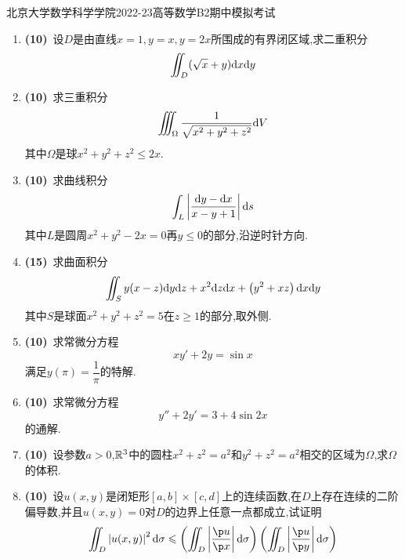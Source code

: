 \documentclass{ctexart}
\begin{document}
\pagestyle{empty}
\begin{center}\Large
    北京大学数学科学学院2022-23高等数学B2期中模拟考试
\end{center}
\begin{enumerate}[leftmargin=*,label=\textbf{\arabic*.}]
    \item \textbf{(10)}\ 设$D$是由直线$x=1,y=x,y=2x$所围成的有界闭区域,求二重积分
        \[\iint_D(\sqrt x+y)\mathrm{d} x\mathrm{d} y\]
    \item \textbf{(10)}\ 求三重积分
        \[\iiint_\Omega\dfrac{1}{\sqrt{x^2+y^2+z^2}}\mathrm{d} V\]
        其中$\Omega$是球$x^2+y^2+z^2\leqslant 2x$.
    \item \textbf{(10)}\ 求曲线积分
        \[\int_L\left|\dfrac{\mathrm{d} y-\mathrm{d} x}{x-y+1}\right|\mathrm{d} s\]
        其中$L$是圆周$x^2+y^2-2x=0$再$y\leqslant 0$的部分,沿逆时针方向.
    \item \textbf{(15)}\ 求曲面积分
        \[\iint_Sy(x-z)\mathrm{d} y\mathrm{d} z+x^2\mathrm{d} z\mathrm{d} x+\left(y^2+xz\right)\mathrm{d} x\mathrm{d} y\]
        其中$S$是球面$x^2+y^2+z^2=5$在$z\geqslant 1$的部分,取外侧.
    \item \textbf{(10)}\ 求常微分方程
        \[xy'+2y=\sin x\]
        满足$y(\pi)=\dfrac1\pi$的特解.
    \item \textbf{(10)}\ 求常微分方程
        \[y''+2y'=3+4\sin 2x\]
        的通解.
    \item \textbf{(10)}\ 设参数$a>0$,$\mathbb{R}^3$中的圆柱$x^2+z^2=a^2$和$y^2+z^2=a^2$相交的区域为$\Omega$,求$\Omega$的体积.
    \item \textbf{(10)}\ 设$u(x,y)$是闭矩形$[a,b]\times[c,d]$上的连续函数,在$D$上存在连续的二阶偏导数,并且$u(x,y)=0$对$D$的边界上任意一点都成立,试证明
        \[\iint_D\left|u(x,y)\right|^2\di\sigma\leqslant\left(\iint_D\left|\dfrac{\p u}{\p x}\right|\di\sigma\right)\left(\iint_D\left|\dfrac{\p u}{\p y}\right|\di\sigma\right)\]
        

\end{enumerate}
\end{document}
